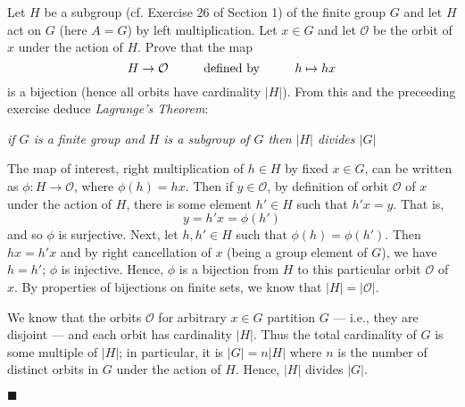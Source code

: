 \documentclass[12pt]{article}
\renewcommand{\qed}{\hfill$\blacksquare$}
\renewenvironment{proof}{\begin{addmargin}[1em]{0em}\begin{newproof}}{\end{newproof}\end{addmargin}\qed}
\newenvironment{problem}[2][Exercise]{\begin{trivlist}
\item[\hskip \labelsep {\bfseries #1}\hskip \labelsep {\bfseries #2.}]}{\end{trivlist}}
\begin{document}
\begin{problem}{1.7.19}
Let $H$ be a subgroup (cf. Exercise 26 of Section 1) of the finite group $G$ and let $H$ act on $G$ (here $A=G$) by left multiplication. Let $x\in G$ and let $\mathcal{O}$ be the orbit of $x$ under the action of $H$. Prove that the map $$ H\rightarrow \mathcal{O} \hspace{10mm} \text{defined by} \hspace{10mm} h\mapsto hx $$ is a bijection (hence all orbits have cardinality $\left|H\right|$). From this and the preceeding exercise deduce \textit{Lagrange's Theorem}:
\begin{center}
    \textit{if $G$ is a finite group and $H$ is a subgroup of $G$ then $\left|H\right|$ divides $\left|G\right|$}
\end{center}
\end{problem}
\begin{proof}
The map of interest, right multiplication of $h\in H$ by fixed $x\in G$, can be written as $\phi:H\rightarrow \mathcal{O}$, where $\phi\left(h\right) = hx$. Then if $y\in \mathcal{O}$, by definition of orbit $\mathcal{O}$ of $x$ under the action of $H$, there is some element $h'\in H$ such that $h'x = y$. That is, $$ y = h'x = \phi\left(h'\right) $$ and so $\phi$ is surjective. Next, let $h,h'\in H$ such that $\phi\left(h\right)=\phi\left(h'\right)$. Then $hx=h'x$ and by right cancellation of $x$ (being a group element of $G$), we have $h=h'$; $\phi$ is injective. Hence, $\phi$ is a bijection from $H$ to this particular orbit $\mathcal{O}$ of $x$. By properties of bijections on finite sets, we know that $\left|H\right| = \left|\mathcal{O}\right|$.

We know that the orbits $\mathcal{O}$ for arbitrary $x\in G$ partition $G$ --- i.e., they are disjoint --- and each orbit has cardinality $\left|H\right|$. Thus the total cardinality of $G$ is some multiple of $\left|H\right|$; in particular, it is $\left|G\right| = n \left|H\right|$ where $n$ is the number of distinct orbits in $G$ under the action of $H$. Hence, $\left|H\right|$ divides $\left|G\right|$.
\end{proof}
\end{document}
